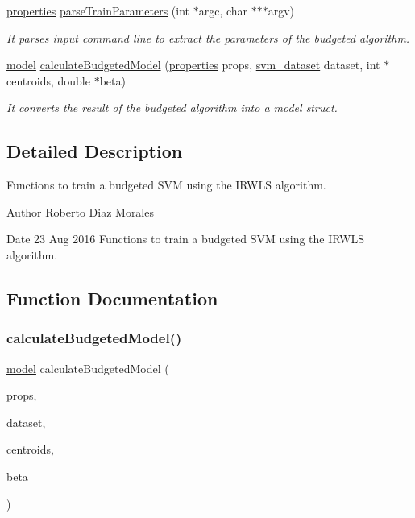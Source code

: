 \begin{DoxyCompactItemize}
\hyperlink{structproperties}{properties} \hyperlink{budgeted-train_8h_a67566f6fd6aec7278ca360186af4e91b}{parse\+Train\+Parameters} (int $\ast$argc, char $\ast$$\ast$$\ast$argv)
\begin{DoxyCompactList}\small\item\em It parses input command line to extract the parameters of the budgeted algorithm. \end{DoxyCompactList}\item 
\hyperlink{structmodel}{model} \hyperlink{budgeted-train_8h_a380a6e19ae274a3df7720a3305ce8d8c}{calculate\+Budgeted\+Model} (\hyperlink{structproperties}{properties} props, \hyperlink{structsvm__dataset}{svm\+\_\+dataset} dataset, int $\ast$centroids, double $\ast$beta)
\begin{DoxyCompactList}\small\item\em It converts the result of the budgeted algorithm into a model struct. \end{DoxyCompactList}\end{DoxyCompactItemize}


\subsection{Detailed Description}
Functions to train a budgeted S\+VM using the I\+R\+W\+LS algorithm. 

\begin{DoxyAuthor}{Author}
Roberto Diaz Morales 
\end{DoxyAuthor}
\begin{DoxyDate}{Date}
23 Aug 2016 Functions to train a budgeted S\+VM using the I\+R\+W\+LS algorithm. 
\end{DoxyDate}


\subsection{Function Documentation}
\hypertarget{budgeted-train_8h_a380a6e19ae274a3df7720a3305ce8d8c}{}\label{budgeted-train_8h_a380a6e19ae274a3df7720a3305ce8d8c} 
\subsubsection{\texorpdfstring{calculate\+Budgeted\+Model()}{calculateBudgetedModel()}}
{\ttfamily \hyperlink{structmodel}{model} calculate\+Budgeted\+Model (\begin{DoxyParamCaption}\item[{\hyperlink{structproperties}{properties}}]{props,  }\item[{\hyperlink{structsvm__dataset}{svm\+\_\+dataset}}]{dataset,  }\item[{int $\ast$}]{centroids,  }\item[{double $\ast$}]{beta }\end{DoxyParamCaption})}



